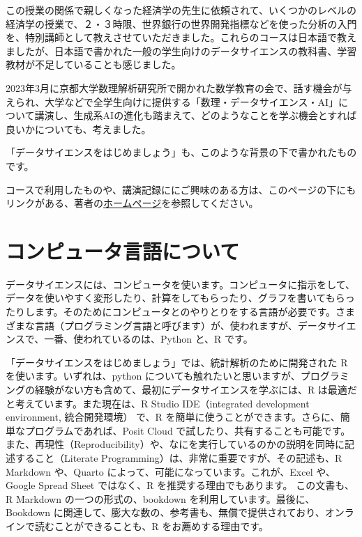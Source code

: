 \documentclass[
  xelatex, ja=standard]{bxjsbook}
\theoremstyle{definition}
\theoremstyle{definition}
\theoremstyle{definition}
\theoremstyle{definition}
\theoremstyle{remark}
\begin{document}
この授業の関係で親しくなった経済学の先生に依頼されて、いくつかのレベルの経済学の授業で、２・３時限、世界銀行の世界開発指標などを使った分析の入門を、特別講師として教えさせていただきました。これらのコースは日本語で教えましたが、日本語で書かれた一般の学生向けのデータサイエンスの教科書、学習教材が不足していることも感じました。

2023年3月に京都大学数理解析研究所で開かれた数学教育の会で、話す機会が与えられ、大学などで全学生向けに提供する「数理・データサイエンス・AI」について講演し、生成系AIの進化も踏まえて、どのようなことを学ぶ機会とすれば良いかについても、考えました。

「データサイエンスをはじめましょう」も、このような背景の下で書かれたものです。

コースで利用したものや、講演記録ににご興味のある方は、このページの下にもリンクがある、著者の\href{https://icu-hsuzuki.github.io/science/computer/learning/ds.html}{ホームページ}を参照してください。

\hypertarget{ux30b3ux30f3ux30d4ux30e5ux30fcux30bfux8a00ux8a9eux306bux3064ux3044ux3066}{%
\section*{コンピュータ言語について}\label{ux30b3ux30f3ux30d4ux30e5ux30fcux30bfux8a00ux8a9eux306bux3064ux3044ux3066}}

データサイエンスには、コンピュータを使います。コンピュータに指示をして、データを使いやすく変形したり、計算をしてもらったり、グラフを書いてもらったりします。そのためにコンピュータとのやりとりをする言語が必要です。さまざまな言語（プログラミング言語と呼びます）が、使われますが、データサイエンスで、一番、使われているのは、Python と、R です。

「データサイエンスをはじめましょう」では、統計解析のために開発された R を使います。いずれは、python についても触れたいと思いますが、プログラミングの経験がない方も含めて、最初にデータサイエンスを学ぶには、R は最適だと考えています。また現在は、R Studio IDE（integrated development environment, 統合開発環境） で、R を簡単に使うことができます。さらに、簡単なプログラムであれば、Posit Cloud で試したり、共有することも可能です。また、再現性（Reproducibility）や、なにを実行しているのかの説明を同時に記述すること（Literate Programming）は、非常に重要ですが、その記述も、R Markdown や、Quarto によって、可能になっています。これが、Excel や、Google Spread Sheet ではなく、R を推奨する理由でもあります。 この文書も、R Markdown の一つの形式の、bookdown を利用しています。最後に、Bookdown に関連して、膨大な数の、参考書も、無償で提供されており、オンラインで読むことができることも、R をお薦めする理由です。
\end{document}
